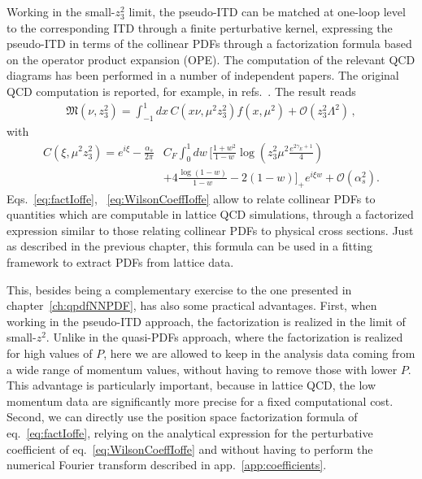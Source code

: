 Working in the small-$z_3^2$ limit, the pseudo-ITD can be matched at one-loop level to the corresponding ITD
through a finite perturbative kernel, expressing the pseudo-ITD in terms of the collinear PDFs through a factorization formula
based on the operator product expansion (OPE).  
The computation of the relevant QCD diagrams has been performed in a number of independent papers.
The original QCD computation is reported, for example, 
in refs.~\cite{Radyushkin:2017lvu, Radyushkin:2016hsy, Izubuchi:2018srq, Ji:2017rah}.
The result reads
\begin{align}
	\label{eq:factIoffe}
	\mathfrak{M}\left(\nu, z_3^2\right) = \int_{-1}^{1} dx\,C\left(x\nu,\mu^2 z_3^2\right)f\left(x,\mu^2\right) + \mathcal{O}\left(z_3^2\Lambda^2\right)\,, 
\end{align}
with
\begin{align}
	\label{eq:WilsonCoeffIoffe}
	C\left(\xi,\mu^2 z_3^2\right) 
	= e^{i\xi} \nonumber -\frac{\alpha_s}{2\pi}& C_F \int_0^1 dw \, \biggl[\frac{1+w^2}{1-w} \log\left(z_3^2\mu^2\frac{e^{2\gamma_E + 1}}{4}\right) \nonumber \\
	&+4\frac{\log\left(1-w\right)}{1-w} -2\left(1-w\right)\biggr]_+ e^{i \xi w} + \mathcal{O}\left(\alpha_s^2\right).
\end{align}
Eqs.~\eqref{eq:factIoffe}, ~\eqref{eq:WilsonCoeffIoffe} allow to relate collinear PDFs to quantities
which are computable in lattice QCD simulations, through a factorized expression similar to those
relating collinear PDFs to physical cross sections. Just as described in the previous chapter, 
this formula can be used in a fitting framework to extract PDFs from lattice data.

This, besides being a complementary exercise to the one presented in chapter~\ref{ch:qpdfNNPDF}, has also some
practical advantages. First, when working in the pseudo-ITD approach, the factorization is realized in the limit of small-$z^2$.
Unlike in the quasi-PDFs approach, where the factorization is realized for high values of $P$,
here we are allowed to keep in the analysis data coming from a wide range of momentum values, 
without having to remove those with lower $P$.
This advantage is particularly important, because in lattice QCD, the low momentum data are significantly more precise for a fixed computational cost.
Second, we can directly use the position space factorization formula of eq.~\eqref{eq:factIoffe}, relying on the analytical
expression for the perturbative coefficient of eq.~\eqref{eq:WilsonCoeffIoffe} and without having
to perform the numerical Fourier transform described in app.~\ref{app:coefficients}.

